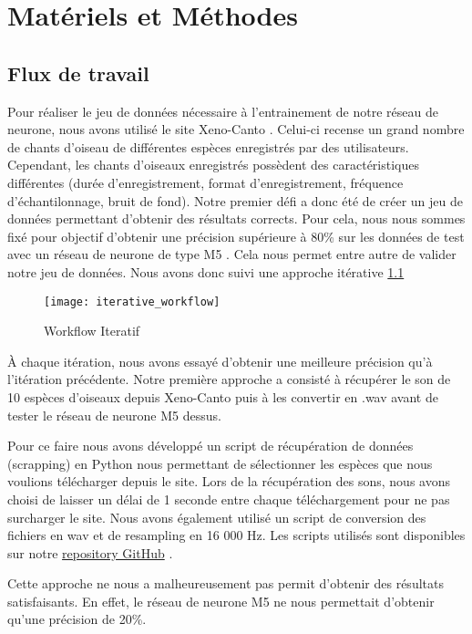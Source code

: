 \chapter{Matériels et Méthodes}

\section{Flux de travail}

Pour réaliser le jeu de données nécessaire à l'entrainement de notre réseau de neurone,
nous avons utilisé le site Xeno-Canto \cite{XenoCanto}. Celui-ci recense un grand nombre de chants d'oiseau
de différentes espèces enregistrés par des utilisateurs.
Cependant, les chants d'oiseaux enregistrés possèdent des caractéristiques différentes (durée d'enregistrement,
format d'enregistrement, fréquence d'échantilonnage, bruit de fond).
Notre premier défi a donc été de créer un jeu de données permettant 
d'obtenir des résultats corrects. 
Pour cela, nous nous sommes fixé pour objectif d'obtenir une précision supérieure à 80\% sur les données de test
avec un réseau de neurone de type M5 \cite{M5}.
Cela nous permet entre autre de valider notre jeu de données. 
Nous avons donc suivi une approche itérative \ref{graph:iterative_workflow}

\begin{figure}[!ht]
  \texttt{[image: iterative\_workflow]}
  \centering
  \caption{Workflow Iteratif}
  \label{graph:iterative_workflow}
\end{figure}

À chaque itération, nous avons essayé d'obtenir une meilleure précision qu'à l'itération précédente.
Notre première approche a consisté à récupérer le son de 10 espèces d'oiseaux depuis Xeno-Canto puis
à les convertir en .wav avant de tester le réseau de neurone M5 dessus.

Pour ce faire nous avons développé un script de récupération de données (scrapping) en Python nous permettant de sélectionner les espèces 
que nous voulions télécharger depuis le site. Lors de la récupération des sons, nous avons choisi de laisser 
un délai de 1 seconde entre chaque téléchargement pour ne pas surcharger le site. Nous avons également utilisé un script 
de conversion des fichiers en wav et de resampling en 16 000 Hz. Les scripts utilisés sont disponibles sur
notre \href{https://github.com/SamiElkateb/embedded_ai_project}{repository GitHub} \cite{Repository}.

Cette approche ne nous a malheureusement pas permit d'obtenir des résultats satisfaisants. En effet, 
le réseau de neurone M5 ne nous permettait d'obtenir qu'une précision de 20\%.

